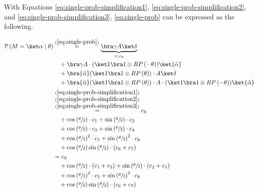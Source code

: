 With Equations \ref{eq:single-prob-simplification1},
\ref{eq:single-prob-simplification2}, and \ref{eq:single-prob-simplification3},
\autoref{eq:single-prob} can be expressed as the following.

\begin{equation}
    \label{eq:single-prob-simplified}
    \begin{split}
        \mathbb{P}\left(M = \ket\alpha \mid \theta\right)
            &\stackrel{(\ref{eq:single-prob})}= \underbrace{\bra\gamma A \ket\delta}_{=: c_9} \\
                &\quad + \bra\gamma A \cdot (\ket 1 \bra 1 \otimes RP\left(-\theta\right)) \ket{\tilde\alpha} \\
                &\quad + \bra{\tilde\alpha} (\ket 1 \bra 1 \otimes RP\left(\theta\right)) \cdot A \ket\delta \\
                &\quad + \bra{\tilde\alpha} (\ket 1 \bra 1 \otimes RP\left(\theta\right)) \cdot A \cdot (\ket 1 \bra 1 \otimes RP\left(-\theta\right)) \ket{\tilde\alpha} \\
            &\stackrel{\substack{(\ref{eq:single-prob-simplification1})\\(\ref{eq:single-prob-simplification2})\\(\ref{eq:single-prob-simplification3})}}=
                c_9 \\
                &\quad + \cos\left(\sfrac\theta2\right) \cdot c_1 + \sin\left(\sfrac\theta2\right) \cdot c_2 \\
                &\quad + \cos\left(\sfrac\theta2\right) \cdot c_3 + \sin\left(\sfrac\theta2\right) \cdot c_4 \\
                &\quad + \cos\left(\sfrac\theta2\right)^2 \cdot c_5 + \sin\left(\sfrac\theta2\right)^2 \cdot c_8 \\
                &\quad + \cos\left(\sfrac\theta2\right)\sin\left(\sfrac\theta2\right) \cdot \left(c_6 + c_7\right) \\
            &= c_9 \\
                &\quad + \cos\left(\sfrac\theta2\right) \cdot \left(c_1 + c_3\right) + \sin\left(\sfrac\theta2\right) \cdot \left(c_2 + c_4\right) \\
                &\quad + \cos\left(\sfrac\theta2\right)^2 \cdot c_5 + \sin\left(\sfrac\theta2\right)^2 \cdot c_8 \\
                &\quad + \cos\left(\sfrac\theta2\right)\sin\left(\sfrac\theta2\right) \cdot \left(c_6 + c_7\right) \\
    \end{split}
\end{equation}

